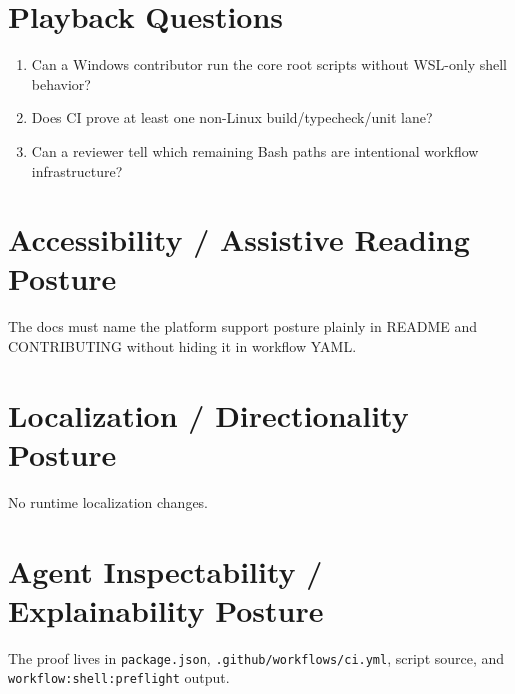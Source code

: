 \section{Playback Questions}\label{record-206-playback-questions}

\begin{enumerate}
\def\labelenumi{\arabic{enumi}.}
\tightlist
\item
  Can a Windows contributor run the core root scripts without WSL-only shell behavior?
\item
  Does CI prove at least one non-Linux build/typecheck/unit lane?
\item
  Can a reviewer tell which remaining Bash paths are intentional workflow infrastructure?
\end{enumerate}

\section{Accessibility / Assistive Reading Posture}\label{record-206-accessibility-assistive-reading-posture}

The docs must name the platform support posture plainly in README and CONTRIBUTING without hiding it in workflow YAML.

\section{Localization / Directionality Posture}\label{record-206-localization-directionality-posture}

No runtime localization changes.

\section{Agent Inspectability / Explainability Posture}\label{record-206-agent-inspectability-explainability-posture}

The proof lives in \texttt{p\allowbreak{}a\allowbreak{}c\allowbreak{}k\allowbreak{}a\allowbreak{}g\allowbreak{}e\allowbreak{}.\allowbreak{}j\allowbreak{}s\allowbreak{}o\allowbreak{}n}, \texttt{.\allowbreak{}g\allowbreak{}i\allowbreak{}t\allowbreak{}h\allowbreak{}u\allowbreak{}b\allowbreak{}/\allowbreak{}w\allowbreak{}o\allowbreak{}r\allowbreak{}k\allowbreak{}f\allowbreak{}l\allowbreak{}o\allowbreak{}w\allowbreak{}s\allowbreak{}/\allowbreak{}c\allowbreak{}i\allowbreak{}.\allowbreak{}y\allowbreak{}m\allowbreak{}l}, script source, and \texttt{w\allowbreak{}o\allowbreak{}r\allowbreak{}k\allowbreak{}f\allowbreak{}l\allowbreak{}o\allowbreak{}w\allowbreak{}:\allowbreak{}s\allowbreak{}h\allowbreak{}e\allowbreak{}l\allowbreak{}l\allowbreak{}:\allowbreak{}p\allowbreak{}r\allowbreak{}e\allowbreak{}f\allowbreak{}l\allowbreak{}i\allowbreak{}g\allowbreak{}h\allowbreak{}t} output.


